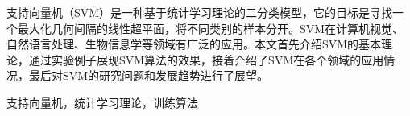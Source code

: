
\clearpage

\setcounter{page}{1}



支持向量机（SVM）是一种基于统计学习理论的二分类模型，它的目标是寻找一个最大化几何间隔的线性超平面，将不同类别的样本分开。SVM在计算机视觉、自然语言处理、生物信息学等领域有广泛的应用。本文首先介绍SVM的基本理论，通过实验例子展现SVM算法的效果，接着介绍了SVM在各个领域的应用情况，最后对SVM的研究问题和发展趋势进行了展望。

\vspace{\baselineskip}
 支持向量机，统计学习理论，训练算法



\titlespacing{\chapter}{0pt}{-6mm}{5mm}
